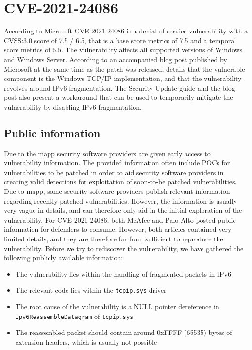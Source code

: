 \documentclass{report}
\begin{document}
\section{CVE-2021-24086}
\label{sec:CVE-2021-24086}
According to Microsoft\cite{url:microsoft:cve-2021-24086} CVE-2021-24086 is a denial of service vulnerability with a CVSS:3.0 score of 7.5 / 6.5, that is a base score metrics of 7.5 and a temporal score metrics of 6.5. The vulnerability affects all supported versions of Windows and Windows Server. According to an accompanied blog post published by Microsoft
\cite{url:microsoft:cve-2021-24086-blog} at the same time as the patch was released, details that the vulnerable component is the Windows TCP/IP implementation, and that the vulnerability revolves around IPv6 fragmentation. The Security Update guide and the blog post also present a workaround that can be used to temporarily mitigate the vulnerability by disabling IPv6 fragmentation.

\subsection{Public information}
\label{sec:CVE-2021-24086:public-information}
Due to the \gls{mapp}\cite{url:microsoft:mapp} security software providers are given early access to vulnerability information. The provided information often include \gls{POC}s for vulnerabilities to be patched in order to aid security software providers in creating valid detections for exploitation of soon-to-be patched vulnerabilities. Due to \gls{mapp}, some security software providers publish relevant information regarding recently patched vulnerabilities. However, the information is usually very vague in details, and can therefore only aid in the initial exploration of the vulnerability. For CVE-2021-24086, both McAfee\cite{url:mcafee:cve-2021-24086} and Palo Alto\cite{url:palo-alto:cve-2021-24086} posted public information for defenders to consume. However, both articles contained very limited details, and they are therefore far from sufficient to reproduce the vulnerability. Before we try to rediscover the vulnerability, we have gathered the following publicly available information:

\begin{itemize}
    \item The vulnerability lies within the handling of fragmented packets in IPv6
    \item The relevant code lies within the \texttt{tcpip.sys} driver
    \item The root cause of the vulnerability is a NULL pointer dereference in \texttt{Ipv6ReassembleDatagram} of \texttt{tcpip.sys}
    \item The reassembled packet should contain around 0xFFFF (65535) bytes of extension headers, which is usually not possible
\end{itemize}
 
\end{document}
